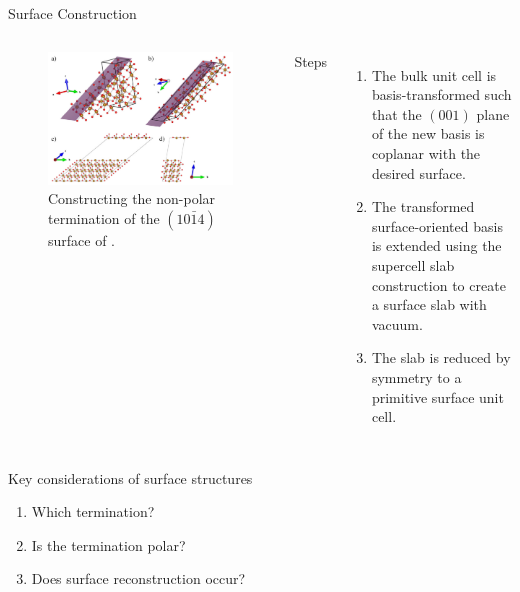 \documentclass[aspectratio=169]{beamer}
\begin{document}
\begin{frame}{Surface Construction}
\begin{columns}
\begin{figure}
    \centering
    \includegraphics[width=\linewidth]{lectures/figures/11_surface_construction.png}
    \caption{Constructing the non-polar termination of the $(10\bar{1}4)$ surface of .\cite{sunEfficientCreationConvergence2013}}
\end{figure} 
Steps
\begin{enumerate}
    \item The bulk unit cell is basis-transformed such that the $(001)$ plane of the new basis is coplanar with the desired surface. 
    \item The transformed surface-oriented basis is extended using the supercell slab construction to create a surface slab with vacuum.
    \item The slab is reduced by symmetry to a primitive surface unit cell.
\end{enumerate}
\end{columns} 

\end{frame} 

\begin{frame}{Key considerations of surface structures}
\begin{enumerate}
    \item Which termination?
    \item Is the termination polar?
    \item Does surface reconstruction occur?
\end{enumerate}

\end{frame}
\end{document}
